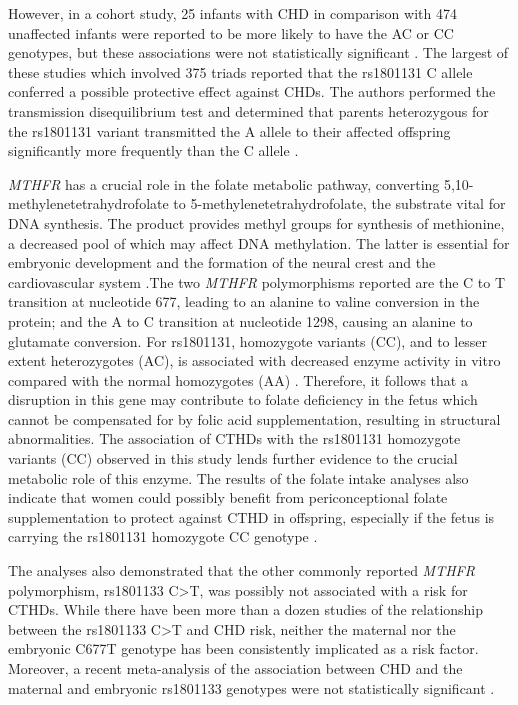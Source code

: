 \begin{refsection}
However, in a cohort study, 25 infants with CHD in comparison with 474 unaffected infants were reported to be more likely to have the AC or CC genotypes, but these associations were not statistically significant \cite{nurk2004associations}. The largest of these studies which involved 375 triads reported that the rs1801131 C allele conferred a possible protective effect against CHDs. The authors performed the transmission disequilibrium test and determined that parents heterozygous for the rs1801131 variant transmitted the A allele to their affected offspring significantly more frequently than the C allele \cite{hobbs2006congenital}.


\begin{sloppypar}\textit{MTHFR} has a crucial role in the folate metabolic pathway, converting 5,10-methylenetetrahydrofolate to 5-methylenetetrahydrofolate, the substrate vital for DNA synthesis.  The product provides methyl groups for synthesis of methionine, a decreased pool of which may affect DNA methylation. The latter is essential for embryonic development and the formation of the neural crest and the cardiovascular system \cite{hobbs2006congenital}.The two \textit{MTHFR} polymorphisms reported are the C to T transition at nucleotide 677, leading to an alanine to valine conversion in the protein; and the A to C transition at nucleotide 1298, causing an alanine to glutamate conversion. For rs1801131, homozygote variants (CC), and to lesser extent heterozygotes (AC), is associated with decreased enzyme activity in vitro compared with the normal homozygotes (AA) \cite{hobbs2006congenital}. Therefore, it follows that a disruption in this gene may contribute to folate deficiency in the fetus which cannot be compensated for by folic acid supplementation, resulting in structural abnormalities. The association of CTHDs with the rs1801131 homozygote variants (CC) observed in this study lends further evidence to the crucial metabolic role of this enzyme. The results of the folate intake analyses also indicate that women could possibly benefit from periconceptional folate supplementation to protect against CTHD in offspring, especially if the fetus is carrying the rs1801131 homozygote CC genotype \cite{henderson1995maternal}.\end{sloppypar}

The analyses also demonstrated that the other commonly reported \textit{MTHFR} polymorphism, rs1801133 C>T, was possibly not associated with a risk for CTHDs. While there have been more than a dozen studies of the relationship between the rs1801133 C>T and CHD risk, neither the maternal nor the embryonic C677T genotype has been consistently implicated as a risk factor. Moreover, a recent meta-analysis of the association between CHD and the maternal and embryonic rs1801133 genotypes were not statistically significant \cite{nie2011methylenetetrahydrofolate}.


\end{refsection}
